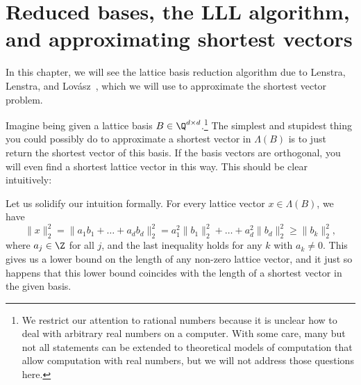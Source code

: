 %
%
%

\chapter{Reduced bases, the LLL algorithm, and approximating shortest vectors}
\label{chapter:basis-reduction-LLL}

In this chapter, we will see the lattice basis reduction algorithm due to
Lenstra, Lenstra, and Lovász~\cite{MR682664}, which we will use to approximate the shortest
vector problem.

Imagine being given a lattice basis $B \in \Q^{d \times d}$.\footnote{We
restrict our attention to rational numbers because it is unclear how to deal with arbitrary real numbers
on a computer. With some care, many but not all statements can be extended to theoretical models of computation
that allow computation with real numbers, but we will not address those questions here.}
The simplest and stupidest thing you could possibly do to approximate a shortest vector in $\Lambda(B)$
is to just return the shortest vector of this basis.
If the basis vectors are orthogonal, you will even find a shortest lattice vector
in this way.
This should be clear intuitively:
\begin{center}
\end{center}
Let us solidify our intuition formally.
For every lattice vector $x \in \Lambda(B)$,
we have
\[
  \|x\|_2^2 = \|a_1b_1 + \dots + a_db_d\|_2^2 = a_1^2 \|b_1\|_2^2 + \dots + a_d^2 \|b_d\|_2^2 \geq \|b_k\|_2^2,
\]
where $a_j \in \Z$ for all $j$,
and the last inequality holds for any $k$ with $a_k \neq 0$.
This gives us a lower bound on the length of any non-zero lattice vector,
and it just so happens that this lower bound coincides with the length of a shortest vector in the given basis.

